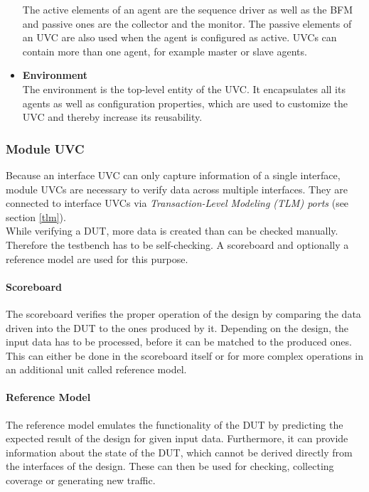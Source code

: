 \begin{itemize}
  The active elements of an agent are the sequence driver as well as the BFM and passive ones are the collector and the monitor. 
  The passive elements of an UVC are also used when the agent is configured as active. 
  UVCs can contain more than one agent, for example master or slave agents.
  \item \textbf{Environment}\\
  The environment is the top-level entity of the UVC. 
  It encapsulates all its agents as well as configuration properties, which are used to customize the UVC and thereby increase its reusability.
\end{itemize}

\subsubsection{Module UVC}\label{module_uvc}

Because an interface UVC can only capture information of a single interface, module UVCs are necessary to verify data across multiple interfaces. 
They are connected to interface UVCs via \emph{Transaction-Level Modeling (TLM) ports} (see section \ref{tlm}).\\
While verifying a DUT, more data is created than can be checked manually.
Therefore the testbench has to be self-checking.
A scoreboard and optionally a reference model are used for this purpose.

\paragraph{Scoreboard}
The scoreboard verifies the proper operation of the design by comparing the data driven into the DUT to the ones produced by it.
Depending on the design, the input data has to be processed, before it can be matched to the produced ones.
This can either be done in the scoreboard itself or for more complex operations in an additional unit called reference model.

\paragraph{Reference Model}
The reference model emulates the functionality of the DUT by predicting the expected result of the design for given input data.
Furthermore, it can provide information about the state of the DUT, which cannot be derived directly from the interfaces of the design.
These can then be used for checking, collecting coverage or generating new traffic.\\


